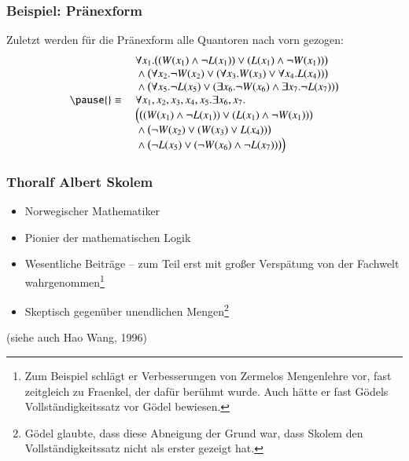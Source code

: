 \documentclass[aspectratio=1610,onlymath]{beamer}
\begin{document}
\begin{frame}\frametitle{Beispiel: Pränexform}

Zuletzt werden für die Pränexform alle Quantoren nach vorn gezogen:
\[\begin{array}{rl}
& \forall x_1.\big((W(x_1)\wedge\neg L(x_1))\vee (L(x_1)\wedge\neg W(x_1))\big)\\
& {}\wedge{}  \big(\forall x_2.\neg W(x_2)\vee(\forall x_3.W(x_3) \vee \forall x_4.L(x_4))\big)\\
& {}\wedge{}  \big(\forall x_5.\neg L(x_5)\vee(\exists x_6.\neg W(x_6) \wedge \exists x_7.\neg L(x_7))\big)\\\pause
{}\equiv{} & \forall x_1,x_2,x_3,x_4,x_5.\exists x_6,x_7.\\
& \Big(\big((W(x_1)\wedge\neg L(x_1))\vee (L(x_1)\wedge\neg W(x_1))\big)\\
& {}\wedge{}  \big(\neg W(x_2)\vee(W(x_3) \vee L(x_4))\big)\\
& {}\wedge{}  \big(\neg L(x_5)\vee(\neg W(x_6) \wedge \neg L(x_7))\big)\Big)
\end{array}
\]


\end{frame}


\begin{frame}\frametitle{Thoralf Albert Skolem }

\begin{itemize}
\item Norwegischer Mathematiker
\item Pionier der mathematischen Logik
\item Wesentliche Beiträge -- zum Teil erst mit großer Verspätung von der Fachwelt wahrgenommen\footnote{Zum Beispiel schlägt er Verbesserungen von Zermelos Mengenlehre vor, fast zeitgleich zu Fraenkel, der dafür berühmt wurde. Auch hätte er fast Gödels Vollständigkeitssatz vor Gödel bewiesen.}
\item Skeptisch gegenüber unendlichen Mengen\footnote{Gödel glaubte, dass diese Abneigung der Grund war, dass Skolem den Vollständigkeitssatz nicht als erster gezeigt hat.}
\end{itemize}\bigskip

(siehe auch Hao Wang, 1996)

\end{frame}
\end{document}
